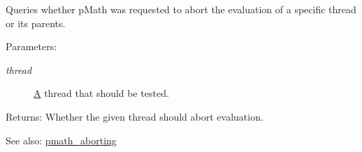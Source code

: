 Queries whether pMath was requested to abort the evaluation of a specific thread or its parents. 

\begin{Desc}
\item[Parameters:]
\begin{description}
\item[{\em thread}]\hyperlink{class_a}{A} thread that should be tested. \end{description}
\end{Desc}
\begin{Desc}
\item[Returns:]Whether the given thread should abort evaluation.\end{Desc}
\begin{Desc}
\item[See also:]\hyperlink{group__threads_gb75a9c87401fddb42b297ddb0495415f}{pmath\_\-aborting} \end{Desc}
